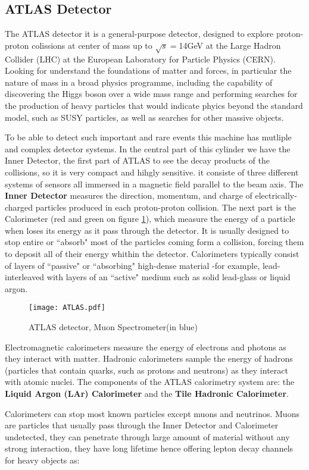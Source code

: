 \subsection{ATLAS Detector}
The ATLAS detector it is a general-purpose detector, designed to explore proton-proton colissions at center of mass up
to $\sqrt{s}=$14GeV at the Large Hadron Collider (LHC) at the European Laboratory for Particle Physics (CERN). Looking
for understand the foundations of matter and forces, in particular the nature of mass in a broad physics programme,
	including the capability of discovering the Higgs boson over a wide mass range and performing searches for the
	production of heavy particles that would indicate phyics beyond the standard model, such as SUSY particles, as well as
	searches for other massive objects. \par 
To be able to detect such important and rare events this machine has mutliple and complex detector systems. In the
central part of this cylinder we have the Inner Detector, the first part of ATLAS to see the decay products of the
collisions, so it is very compact and hihgly sensitive. it consiste of three different systems of sensors all immersed
in a magnetic field parallel to the beam axis. The {\bf Inner Detector} measures the direction, momentum, and charge of
electrically-charged particles produced in each proton-proton collision. The next part is the Calorimeter (red and green
on figure \ref{fig:ATLAS}), which  measure the energy of a particle when loses its energy as it pass through the
detector. It is usually designed to stop entire or ``absorb" most of the particles coming form a collision, forcing them
to deposit all of their energy whithin the detector. Calorimeters typically consist of layers of ``passive" or
``absorbing" high-dense material -for example, lead- interleaved with layers of an ``active" medium such as solid
lead-glass or liquid argon.\par
\begin{figure}[ht]
		\centering
		\texttt{[image: ATLAS.pdf]}
		\caption{ATLAS detector, Muon Spectrometer(in blue)}\label{fig:ATLAS}
\end{figure}
Electromagnetic calorimeters measure the energy of electrons and photons as they interact with matter. Hadronic
calorimeters sample the energy of hadrons (particles that contain quarks, such as protons and neutrons) as they interact
with atomic nuclei. The components of the ATLAS calorimetry system are: the {\bf Liquid Argon (LAr) Calorimeter} and the
{\bf Tile Hadronic Calorimeter}.\par
Calorimeters can stop most known particles except muons and neutrinos. Muons are particles that usually pass through the
Inner Detector and Calorimeter undetected, they can penetrate through large amount of material without any strong
interaction, they have long lifetime hence offering lepton decay channels for heavy objects as:

